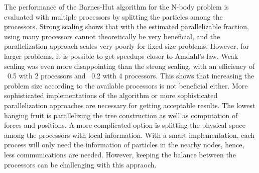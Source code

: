 \documentclass[10pt,journal,compsocconf]{IEEEtran}
\begin{document}
The performance of the Barnes-Hut algorithm for the N-body problem is evaluated with multiple processors by splitting the particles among the processors. Strong scaling shows that with the estimated parallelizable fraction, using many processors cannot theoretically be very beneficial, and the parallelization approach scales very poorly for fixed-size problems. However, for larger problems, it is possible to get speedups closer to Amdahl's law. Weak scaling was even more disappointing than the strong scaling, with an efficiency of ~0.5 with 2 processors and ~0.2 with 4 processors. This shows that increasing the problem size according to the available processors is not beneficial either. More sophisticated implementations of the algorithm or more sophisticated parallelization approaches are necessary for getting acceptable results. The lowest hanging fruit is parallelizing the tree construction as well as computation of forces and positions. A more complicated option is splitting the physical space among the processors with local information. With a smart implementation, each process will only need the information of particles in the nearby nodes, hence, less communications are needed. However, keeping the balance between the processors can be challenging with this appraoch.
\end{document}
